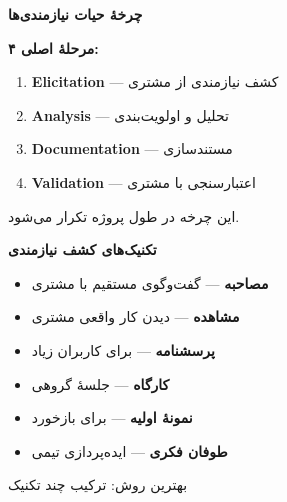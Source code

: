 \documentclass[14pt, a4paper, landscape]{extarticle}
\newcommand{\slide}[1]{%
    \newpage
    \begin{center}
    \begin{minipage}[t]{0.95\textwidth}
    \vspace{0.5cm}
    #1
    \vspace{0.5cm}
    \end{minipage}
    \end{center}
}
\newcommand{\slidetitle}[1]{%
    \begin{center}
        {\LARGE\bfseries\textcolor{primary}{#1}}
    \end{center}
    \vspace{0.5cm}
}
\newcommand{\myaccent}[1]{\textcolor{accent}{#1}}
\begin{document}
\slide{
    \slidetitle{چرخهٔ حیات نیازمندی‌ها}
    \vspace{0.5cm}
    \begin{center}
        {\large\bfseries ۴ مرحلهٔ اصلی:}
    \end{center}
    \vspace{0.5cm}
    \begin{enumerate}[itemsep=0.7em]
        \item {\large\textbf{\textcolor{primary}{Elicitation}} — کشف نیازمندی از مشتری}
        \item {\large\textbf{\textcolor{primary}{Analysis}} — تحلیل و اولویت‌بندی}
        \item {\large\textbf{\textcolor{primary}{Documentation}} — مستندسازی}
        \item {\large\textbf{\textcolor{primary}{Validation}} — اعتبارسنجی با مشتری}
    \end{enumerate}
    \vspace{1cm}
    \begin{center}
        {\large\myaccent{این چرخه در طول پروژه تکرار می‌شود.}}
    \end{center}
}

\slide{
    \slidetitle{تکنیک‌های کشف نیازمندی}
    \vspace{0.5cm}
    \begin{itemize}[itemsep=0.6em]
        \item {\large\textbf{مصاحبه} — گفت‌وگوی مستقیم با مشتری}
        \item {\large\textbf{مشاهده} — دیدن کار واقعی مشتری}
        \item {\large\textbf{پرسشنامه} — برای کاربران زیاد}
        \item {\large\textbf{کارگاه} — جلسهٔ گروهی}
        \item {\large\textbf{نمونهٔ اولیه} — برای بازخورد}
        \item {\large\textbf{طوفان فکری} — ایده‌پردازی تیمی}
    \end{itemize}
    \vspace{0.5cm}
    \begin{center}
        {\myaccent{بهترین روش: ترکیب چند تکنیک}}
    \end{center}
}
\end{document}
